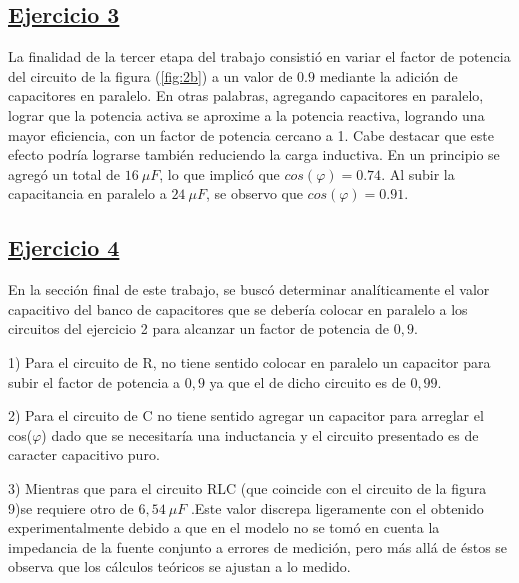 \documentclass[a4paper]{article}
\begin{document}
\subsection*{\underline{Ejercicio 3}}
La finalidad de la tercer etapa del trabajo consistió en variar el factor de potencia del circuito de la figura (\ref{fig:2b}) a un valor de $ 0.9 $ mediante la adición de capacitores en paralelo. En otras palabras, agregando capacitores en paralelo, lograr que la potencia activa se aproxime a la potencia reactiva, logrando una mayor eficiencia, con un factor de potencia cercano a 1. Cabe destacar que este efecto podría lograrse también reduciendo la carga inductiva. 
En un principio se agregó un total de $ 16 \ \mu F$, lo que implicó que $ cos \left(\varphi \right) = 0.74 $. Al subir la capacitancia en paralelo a $ 24 \ \mu F$, se observo que $ cos \left(\varphi \right) = 0.91 $.

\subsection*{\underline{Ejercicio 4}}
En la sección final de este trabajo, se buscó determinar analíticamente el valor capacitivo del banco de capacitores que se debería colocar en paralelo a los circuitos del ejercicio 2 para alcanzar un factor de potencia de $ 0,9 $. 

1) Para el circuito de R, no tiene sentido colocar en paralelo un capacitor para subir el factor de potencia a $ 0,9 $ ya que el de dicho circuito es de $ 0,99 $.

2) Para el circuito de C no tiene sentido agregar un capacitor para arreglar el cos($\varphi$) dado que se necesitaría una inductancia y el circuito presentado es de caracter capacitivo puro. 

3) Mientras que para el circuito RLC (que coincide con el circuito de la figura 9)se requiere otro de $ 6,54 \ \mu F $ .Este valor discrepa ligeramente con el obtenido experimentalmente debido a que en el modelo no se tomó en cuenta la impedancia de la fuente conjunto a errores de medición, pero más allá de éstos se observa que los cálculos teóricos se ajustan a lo medido. 
\end{document}
